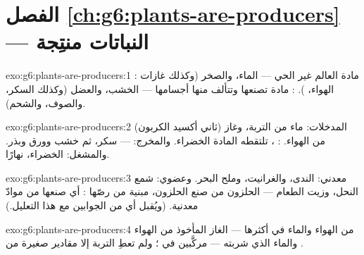 \section*{الفصل \ref{ch:g6:plants-are-producers} --- النباتات منتِجة}

\begin{solution}{exo:g6:plants-are-producers:1}
: مادة العالم غير الحي --- الماء، والصخر (وكذلك
غازات الهواء، ). : مادة تصنعها
 وتتألف منها أجسامها --- الخشب، والعضل (وكذلك السكر،
والصوف، والشحم).
\end{solution}

\begin{solution}{exo:g6:plants-are-producers:2}
المدخلات: ماء  من التربة، وغاز (ثاني أكسيد الكربون)
من الهواء. : ، تلتقطه المادة الخضراء. والمخرج:  --- سكر، ثم خشب وورق  وبذر. والمشغل:  الخضراء،
نهارًا.
\end{solution}

\begin{solution}{exo:g6:plants-are-producers:3}
معدني: الندى، والغرانيت، وملح البحر. وعضوي: شمع النحل، وزيت
الطعام ---  الحلزون من صنع الحلزون، مبنية من 
رصّها : أي صنعها  من موادّ معدنية. (ويُقبل أي من
الجوابين مع هذا التعليل.)
\end{solution}

\begin{solution}{exo:g6:plants-are-producers:4}
من الهواء والماء في أكثرها --- الغاز المأخوذ من الهواء والماء
الذي شربته  --- مركَّبين في   ؛ ولم تعطِ
التربة إلا مقادير صغيرة من .
\end{solution}

